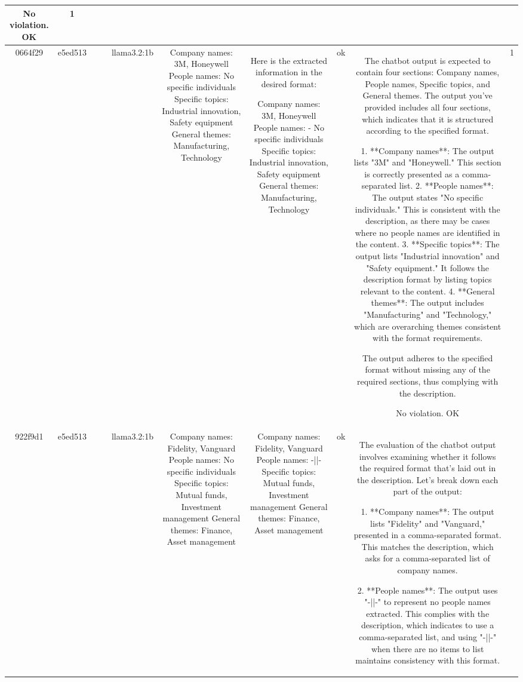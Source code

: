 \begin{table}[h!]
\begin{tabular}{|c|c|c|c|c|c|c|c|c|c|}
No violation.
OK & 1\\
\hline
0664f29 & e5ed513 &  &  & llama3.2:1b & Company names: 3M, Honeywell
People names: No specific individuals
Specific topics: Industrial innovation, Safety equipment
General themes: Manufacturing, Technology & Here is the extracted information in the desired format:

Company names: 3M, Honeywell
People names:
- No specific individuals
Specific topics: Industrial innovation, Safety equipment
General themes: Manufacturing, Technology & ok & The chatbot output is expected to contain four sections: Company names, People names, Specific topics, and General themes. The output you've provided includes all four sections, which indicates that it is structured according to the specified format. 

1. **Company names**: The output lists "3M" and "Honeywell." This section is correctly presented as a comma-separated list.
2. **People names**: The output states "No specific individuals." This is consistent with the description, as there may be cases where no people names are identified in the content.
3. **Specific topics**: The output lists "Industrial innovation" and "Safety equipment." It follows the description format by listing topics relevant to the content.
4. **General themes**: The output includes "Manufacturing" and "Technology," which are overarching themes consistent with the format requirements.

The output adheres to the specified format without missing any of the required sections, thus complying with the description. 

No violation.
OK & 1\\
\hline
922f9d1 & e5ed513 &  &  & llama3.2:1b & Company names: Fidelity, Vanguard
People names: No specific individuals
Specific topics: Mutual funds, Investment management
General themes: Finance, Asset management & Company names: Fidelity, Vanguard
People names: -||-
Specific topics: Mutual funds, Investment management
General themes: Finance, Asset management & ok & The evaluation of the chatbot output involves examining whether it follows the required format that's laid out in the description. Let's break down each part of the output:

1. **Company names**: The output lists "Fidelity" and "Vanguard," presented in a comma-separated format. This matches the description, which asks for a comma-separated list of company names.

2. **People names**: The output uses "-||-" to represent no people names extracted. This complies with the description, which indicates to use a comma-separated list, and using "-||-" when there are no items to list maintains consistency with this format.


\end{tabular}
\end{table}
